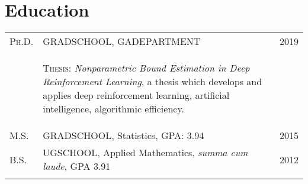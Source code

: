 \documentclass[a4paper,10pt]{article}
\begin{document}
\section{Education}
\begin{supertabular}{p{1.5cm}p{13.9cm}>{\raggedleft\arraybackslash}p{1.5cm}}
	\textsc{Ph.D.} & \textsc{GRADSCHOOL}, \small GADEPARTMENT
	& 	\textsc{2019} \\
	& \begin{enumerate*}[label =$\circ$, itemjoin={\newline}]
	\item \footnotesize \textsc{Thesis:} \emph{Nonparametric Bound Estimation in Deep Reinforcement Learning}, a thesis which develops and applies deep reinforcement learning, artificial intelligence, algorithmic efficiency.
	\end{enumerate*}
	& \\
	\textsc{M.S.} & \textsc{GRADSCHOOL}, \small Statistics, GPA: 3.94
	& 	\textsc{2015} 	\\
	\textsc{B.S.} & \textsc{UGSCHOOL}, \small Applied Mathematics, \emph{summa cum laude}, GPA 3.91
	&	\textsc{2012} 	\\
	 \\
\end{supertabular}



\end{document}
